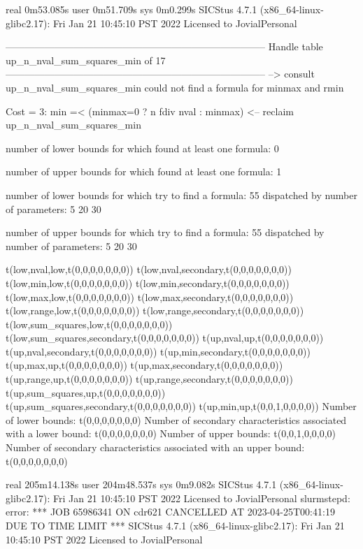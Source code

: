 real	0m53.085s
user	0m51.709s
sys	0m0.299s
SICStus 4.7.1 (x86_64-linux-glibc2.17): Fri Jan 21 10:45:10 PST 2022
Licensed to JovialPersonal


--------------------------------------------------------------------------------
Handle table up_n_nval_sum_squares_min of 17
--------------------------------------------------------------------------------
--> consult up_n_nval_sum_squares_min
could not find a formula for minmax and rmin

Cost =  3:  min =< (minmax=0 ? n fdiv nval : minmax)
<-- reclaim up_n_nval_sum_squares_min

number of lower bounds for which found at least one formula: 0

number of upper bounds for which found at least one formula: 1

number of lower bounds for which try to find a formula: 55
dispatched by number of parameters: 5  20  30

number of upper bounds for which try to find a formula: 55
dispatched by number of parameters: 5  20  30

t(low,nval,low,t(0,0,0,0,0,0,0))
t(low,nval,secondary,t(0,0,0,0,0,0,0))
t(low,min,low,t(0,0,0,0,0,0,0))
t(low,min,secondary,t(0,0,0,0,0,0,0))
t(low,max,low,t(0,0,0,0,0,0,0))
t(low,max,secondary,t(0,0,0,0,0,0,0))
t(low,range,low,t(0,0,0,0,0,0,0))
t(low,range,secondary,t(0,0,0,0,0,0,0))
t(low,sum_squares,low,t(0,0,0,0,0,0,0))
t(low,sum_squares,secondary,t(0,0,0,0,0,0,0))
t(up,nval,up,t(0,0,0,0,0,0,0))
t(up,nval,secondary,t(0,0,0,0,0,0,0))
t(up,min,secondary,t(0,0,0,0,0,0,0))
t(up,max,up,t(0,0,0,0,0,0,0))
t(up,max,secondary,t(0,0,0,0,0,0,0))
t(up,range,up,t(0,0,0,0,0,0,0))
t(up,range,secondary,t(0,0,0,0,0,0,0))
t(up,sum_squares,up,t(0,0,0,0,0,0,0))
t(up,sum_squares,secondary,t(0,0,0,0,0,0,0))
t(up,min,up,t(0,0,1,0,0,0,0))
Number of lower bounds:                                             t(0,0,0,0,0,0,0)
Number of secondary characteristics associated with a lower bound:  t(0,0,0,0,0,0,0)
Number of upper bounds:                                             t(0,0,1,0,0,0,0)
Number of secondary characteristics associated with an upper bound: t(0,0,0,0,0,0,0)

real	205m14.138s
user	204m48.537s
sys	0m9.082s
SICStus 4.7.1 (x86_64-linux-glibc2.17): Fri Jan 21 10:45:10 PST 2022
Licensed to JovialPersonal
slurmstepd: error: *** JOB 65986341 ON cdr621 CANCELLED AT 2023-04-25T00:41:19 DUE TO TIME LIMIT ***
SICStus 4.7.1 (x86_64-linux-glibc2.17): Fri Jan 21 10:45:10 PST 2022
Licensed to JovialPersonal


